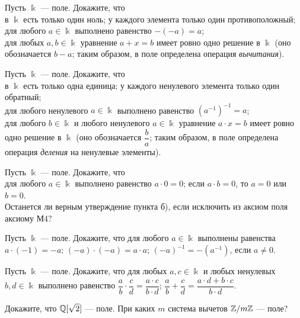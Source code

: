 \documentclass[a4paper,12pt]{article}
\begin{document}
\newpage

Пусть $\Bbbk$ --- поле.  Докажите, что\\
в $\Bbbk$ есть только один ноль;
у каждого элемента только один противоположный;\\
для любого $a\in\Bbbk$ выполнено равенство
$-(-a)=a$;\\
для любых $a,b\in\Bbbk$ уравнение $a+x=b$ имеет ровно одно решение
в $\Bbbk$ (оно обозначается $b-a$; таким образом, в поле
определена операция \emph{вычитания}).


Пусть $\Bbbk$ --- поле. Докажите, что\\
в $\Bbbk$ есть только одна единица;
у каждого ненулевого элемента только один обратный;\\
для любого ненулевого $a\in\Bbbk$ выполнено равенство
$(a^{-1})^{-1}=a$;\\
для любого $b\in\Bbbk$ и любого ненулевого $a\in\Bbbk$ уравнение
$a\cdot x=b$ имеет ровно одно решение в $\Bbbk$ (оно обозначается
$\dfrac b a$; таким образом, в поле определена операция
\emph{деления} на ненулевые элементы).

Пусть $\Bbbk$ --- поле. Докажите, что\\
для любого $a\in\Bbbk$ выполнено равенство $a\cdot 0=0$;
если $a\cdot b=0$, то $a=0$ или $b=0$.\\
Останется ли верным утверждение пункта б), если исключить из аксиом поля
аксиому М4?

Пусть $\Bbbk$ --- поле. Докажите, что для любого $a\in\Bbbk$
выполнены равенства\\
$a\cdot (-1)=-a$;
$(-a)\cdot (-a)=a\cdot a$;
$(-a)^{-1}=-(a^{-1})$, если $a\ne0$.

Пусть $\Bbbk$ --- поле. Докажите, что
для любых $a,c\in\Bbbk$ и любых ненулевых $b,d\in\Bbbk$ выполнено
равенство
$\dfrac a b\cdot\dfrac c d=\dfrac{a\cdot c}{b\cdot d}$;
$\dfrac a b+\dfrac c d=\dfrac{a\cdot d+b\cdot c}{b\cdot d}$.

\label{ex:field}
Докажите, что $\mathbb{Q}[\sqrt{2}]$ — поле.
При каких $m$ система вычетов $\mathbb{Z}/m\mathbb{Z}$ --- поле?
\end{document}
